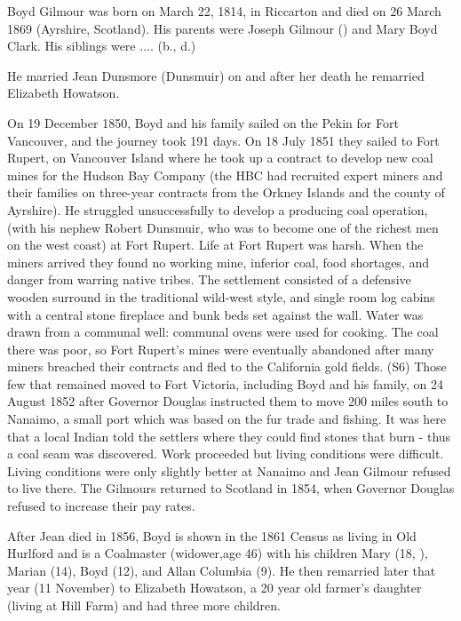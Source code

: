 
Boyd Gilmour was born on March 22, 1814, in Riccarton and died on 26 March 1869 (Ayrshire, Scotland).  His parents were Joseph Gilmour () and Mary Boyd Clark. His siblings were .... (b., d.)

He married Jean Dunsmore (Dunsmuir) on and after her death he remarried Elizabeth Howatson.

On 19 December 1850, Boyd and his family sailed on the Pekin for Fort Vancouver, and the journey took 191 days. On 18 July 1851 they sailed to Fort Rupert, on Vancouver Island where he took up a contract to develop new coal mines for the Hudson Bay Company (the HBC had recruited expert miners and their families on three-year contracts from the Orkney Islands and the county of Ayrshire). He struggled unsuccessfully to develop a producing coal operation, (with his nephew Robert Dunsmuir, who was to become one of the richest men on the west coast) at Fort Rupert. Life at Fort Rupert was harsh. When the miners arrived they found no working mine, inferior coal, food shortages, and danger from warring native tribes. The settlement consisted of a defensive wooden surround in the traditional wild-west style, and single room log cabins with a central stone fireplace and bunk beds set against the wall. Water was drawn from a communal well: communal ovens were used for cooking. The coal there was poor, so Fort Rupert’s mines were eventually abandoned after many miners breached their contracts and fled to the California gold fields. (S6) Those few that remained moved to Fort Victoria, including Boyd and his family, on 24 August 1852 after Governor Douglas instructed them to move 200 miles south to Nanaimo, a small port which was based on the fur trade and fishing. It was here that a local Indian told the settlers where they could find stones that burn - thus a coal seam was discovered. Work proceeded but living conditions were difficult. Living conditions were only slightly better at Nanaimo and Jean Gilmour refused to live there. The Gilmours returned to Scotland in 1854, when Governor Douglas refused to increase their pay rates.

After Jean died in 1856, Boyd is shown in the 1861 Census as living in Old Hurlford and is a Coalmaster (widower,age 46) with his children Mary (18, ), Marian (14), Boyd (12), and Allan Columbia (9). He then remarried later that year (11 November) to Elizabeth Howatson, a 20 year old farmer's daughter (living at Hill Farm) and had three more children.

